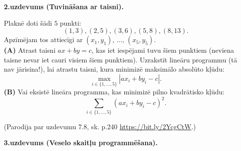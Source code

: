 \documentclass[a4paper,12pt]{article}
\begin{document}















\vspace{20pt}
{\bf 2.uzdevums (Tuvināšana ar taisni).}

Plaknē doti šādi $5$ punkti:
$$(1, 3), (2, 5), (3, 6), (5, 8), (8, 13).$$
Apzīmējam tos attiecīgi ar $(x_1,y_1)$, $\ldots$, $(x_5,y_5)$.\\
{\bf (A)} Atrast taisni $ax + by = c$, kas iet iespējami tuvu šiem punktiem (neviena taisne nevar 
iet cauri visiem šiem punktiem). Uzrakstīt li\-ne\-ā\-ru programmu (tā nav jārisina!), lai atrastu taisni, 
kura minimizē maksimālo absolūto kļūdu:
$$\max_{i \in \{1,\ldots,5\}} |ax_i + by_i - c|.$$
{\bf (B)} Vai eksistē lineāra programma, kas minimizē pilno kvadrātisko kļūdu: 
$$\sum\limits_{i \in \{1,\ldots,5\}} (ax_i + by_i - c)^2.$$

(Parodija par uzdevumu 7.8, sk. p.240 \url{https://bit.ly/2YcgCtW}.)



\vspace{20pt}
{\bf 3.uzdevums (Veselo skaitļu programmēšana).}
\end{document}
